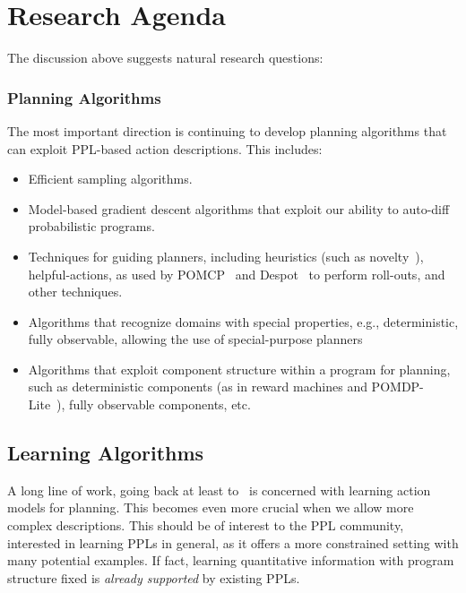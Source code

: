 \documentclass[letterpaper]{article} %
\theoremstyle{definition}
\begin{document}





\section{Research Agenda}
The discussion above suggests natural research questions:
\subsubsection{Planning Algorithms} 
The most important direction is continuing to develop planning algorithms that can exploit PPL-based action descriptions. This includes:
\begin{itemize}
    \item Efficient sampling algorithms.
    \item Model-based gradient descent algorithms that exploit our ability to auto-diff probabilistic programs.
    \item Techniques for guiding planners, including heuristics (such as novelty~\cite{Novelty}), helpful-actions,
    as used by  POMCP~\cite{SV10} and Despot~\cite{Despot} to perform roll-outs, and other techniques.
     \item Algorithms that recognize domains with special properties, e.g., deterministic, fully observable, allowing the use of special-purpose planners
    \item Algorithms that exploit component structure
    within a program for planning, such as
    deterministic components (as in reward machines and POMDP-Lite~\cite{POMDP-lite}), fully observable components, etc. 
\end{itemize}
\subsection{Learning Algorithms}
A long line of work, going back at least to~\cite{YANG2007107} is concerned with  learning action models for planning. This becomes even more crucial when we allow more complex descriptions. This should be of interest to the PPL community, interested in learning PPLs in general, as it offers a more constrained setting with many potential examples. If fact, learning quantitative information with program structure fixed is {\em already supported} by existing
PPLs.
\end{document}
